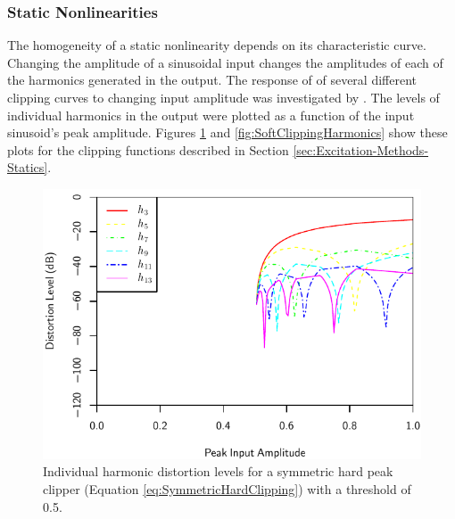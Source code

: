 		\subsubsection*{Static Nonlinearities}
			The homogeneity of a static nonlinearity depends on its characteristic curve. Changing the
			amplitude of a sinusoidal input changes the amplitudes of each of the harmonics generated in the
			output. The response of of several different clipping curves to changing input amplitude was
			investigated by \citet{enderby2012harmonic}. The levels of individual harmonics in the output were
			plotted as a function of the input sinusoid's peak amplitude. Figures
			\ref{fig:HardClippingHarmonics} and \ref{fig:SoftClippingHarmonics} show these plots for the
			clipping functions described in Section \ref{sec:Excitation-Methods-Statics}.

			\begin{figure}[h!]
				\centering
				\includegraphics{chapter5/Images/HardClippingHarmonics.pdf}
				\caption{Individual harmonic distortion levels for a symmetric hard peak clipper (Equation
					 \ref{eq:SymmetricHardClipping}) with a threshold of 0.5.}
				\label{fig:HardClippingHarmonics}
			\end{figure}

